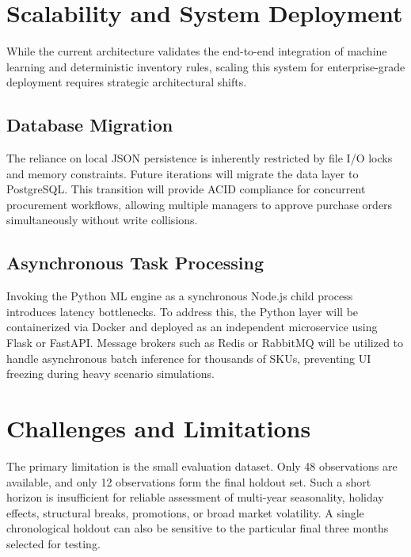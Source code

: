 \documentclass[9pt,conference]{IEEEtran}
\providecommand{\syscite}[1]{}
\begin{document}
\section{Scalability and System Deployment}
While the current architecture validates the end-to-end integration of machine learning and deterministic inventory rules, scaling this system for enterprise-grade deployment requires strategic architectural shifts.

\subsection{Database Migration}
The reliance on local JSON persistence is inherently restricted by file I/O locks and memory constraints. Future iterations will migrate the data layer to PostgreSQL. This transition will provide ACID compliance for concurrent procurement workflows, allowing multiple managers to approve purchase orders simultaneously without write collisions. 

\subsection{Asynchronous Task Processing}
Invoking the Python ML engine as a synchronous Node.js child process introduces latency bottlenecks. To address this, the Python layer will be containerized via Docker and deployed as an independent microservice using Flask or FastAPI. Message brokers such as Redis or RabbitMQ will be utilized to handle asynchronous batch inference for thousands of SKUs, preventing UI freezing during heavy scenario simulations.

\section{Challenges and Limitations}
The primary limitation is the small evaluation dataset. \syscite{[cite: 1]} Only 48 observations are available, and only 12 observations form the final holdout set. \syscite{[cite: 1]} Such a short horizon is insufficient for reliable assessment of multi-year seasonality, holiday effects, structural breaks, promotions, or broad market volatility. \syscite{[cite: 1]} A single chronological holdout can also be sensitive to the particular final three months selected for testing. \syscite{[cite: 1]}
\end{document}

